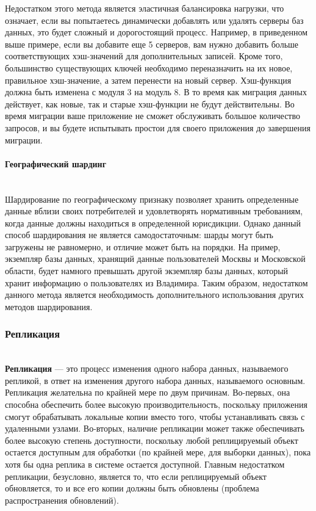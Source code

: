 Недостатком этого метода является эластичная балансировка нагрузки, что означает, если вы попытаетесь динамически
добавлять или удалять серверы баз данных, это будет сложный и дорогостоящий процесс. Например, в приведенном выше
примере, если вы добавите еще 5 серверов, вам нужно добавить больше соответствующих хэш-значений для дополнительных
записей. Кроме того, большинство существующих ключей необходимо переназначить на их новое, правильное хэш-значение,
а затем перенести на новый сервер. Хэш-функция должна быть изменена с модуля 3 на модуль 8. В то время как миграция
данных действует, как новые, так и старые хэш-функции не будут действительны. Во время миграции ваше приложение не
сможет обслуживать большое количество запросов, и вы будете испытывать простои для своего приложения до завершения
миграции. \autocite{DatabaseSharding}

\paragraph{Географический шардинг} ~\\
Шардирование по географическому признаку позволяет хранить определенные данные вблизи своих потребителей и
удовлетворять нормативным требованиям, когда данные должны находиться в определенной юрисдикции. Однако данный способ
шардирования не является самодостаточным: шарды могут быть загружены не равномерно, и отличие может быть на порядки.
На пример, экземпляр базы данных, хранящий данные пользователей Москвы и Московской области, будет намного превышать
другой экземпляр базы данных, который хранит информацию о пользователях из Владимира. Таким образом, недостатком
данного метода является необходимость дополнительного использования других методов шардирования.

\subsubsection{Репликация} ~\\

\textbf{Репликация} — это процесс изменения одного набора данных, называемого репликой, в ответ на изменения другого
набора данных, называемого основным. Репликация желательна по крайней мере по двум причинам. Во-первых, она способна
обеспечить более высокую производительность, поскольку приложения смогут обрабатывать локальные копии вместо того,
чтобы устанавливать связь с удаленными узлами. Во-вторых, наличие репликации может также обеспечивать более высокую
степень доступности, поскольку любой реплицируемый объект остается доступным для обработки (по крайней мере, для выборки
данных), пока хотя бы одна реплика в системе остается доступной. Главным недостатком репликации, безусловно, является
то, что если реплицируемый объект обновляется, то и все его копии должны быть обновлены (проблема распространения
обновлений).

